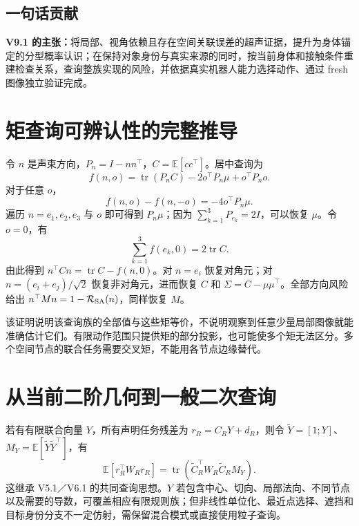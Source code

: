 \documentclass[UTF8,fontset=fandol,11pt,a4paper]{ctexart}
\theoremstyle{plain}
\theoremstyle{definition}
\theoremstyle{remark}
\numberwithin{equation}{section}
\newcommand{\E}{\mathbb E}
\newcommand{\cR}{\mathcal R}
\DeclareMathOperator{\tr}{tr}
\begin{document}
\subsection{一句话贡献}
\begin{corebox}
\textbf{V9.1 的主张：}将局部、视角依赖且存在空间关联误差的超声证据，提升为身体锚定的分型概率认识；在保持对象身份与真实来源的同时，按当前身体和接触条件重建检查关系，查询整族实现的风险，并依据真实机器人能力选择动作、通过 fresh 图像独立验证完成。
\end{corebox}

\appendix
\section{矩查询可辨认性的完整推导}
\label{app:identification}
令 $n$ 是声束方向，$P_n=I-nn^\top$，$C=\E[cc^\top]$。居中查询为
\begin{equation}
 f(n,o)=\tr(P_nC)-2o^\top P_n\mu+o^\top P_no.
\end{equation}
对于任意 $o$，
\begin{equation}
 f(n,o)-f(n,-o)=-4o^\top P_n\mu.
\end{equation}
遍历 $n=e_1,e_2,e_3$ 与 $o$ 即可得到 $P_n\mu$；因为 $\sum_{k=1}^3P_{e_k}=2I$，可以恢复 $\mu$。令 $o=0$，有
\begin{equation}
 \sum_{k=1}^3f(e_k,0)=2\tr C.
\end{equation}
由此得到 $n^\top Cn=\tr C-f(n,0)$。对 $n=e_i$ 恢复对角元；对 $n=(e_i+e_j)/\sqrt2$ 恢复非对角元，进而恢复 $C$ 和 $\Sigma=C-\mu\mu^\top$。全部方向风险给出 $n^\top Mn=1-\cR_{\rm SA}(n)$，同样恢复 $M$。

该证明说明该查询族的全部值与这些矩等价，不说明观察到任意少量局部图像就能准确估计它们。有限动作范围只提供矩的部分投影，也可能使多个矩无法区分。多个空间节点的联合任务需要交叉矩，不能用各节点边缘替代。

\section{从当前二阶几何到一般二次查询}
\label{app:quadratic}
若有有限联合向量 $Y$，所有声明任务残差为 $r_R=C_RY+d_R$，则令 $\widetilde Y=[1;Y]$、$M_Y=\E[\widetilde Y\widetilde Y^\top]$，有
\begin{equation}
 \E[r_R^\top W_Rr_R]=\tr(\widetilde C_R^\top W_R\widetilde C_RM_Y).
\end{equation}
这继承 V5.1／V6.1 的共同查询思想。$Y$ 若包含中心、切向、局部法向、不同节点以及需要的导数，可覆盖相应有限规则族；但非线性单位化、最近点选择、遮挡和目标身份分支不一定仿射，需保留混合模式或直接使用粒子查询。
\end{document}
